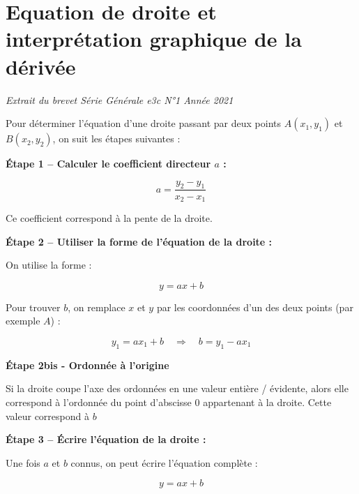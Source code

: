 \documentclass[a4paper,12pt]{article}
\begin{document}
\section*{Equation de droite et interprétation graphique de la dérivée}

\textit{Extrait du brevet Série Générale e3c N°1 Année 2021}

\vspace{1em}

\begin{tcolorbox}[colback=blue!5!white, colframe=blue!75!black, title=Méthode – Trouver l'équation d'une droite à partir de deux points, breakable]
  Pour déterminer l'équation d'une droite passant par deux points $A(x_1, y_1)$ et $B(x_2, y_2)$, on suit les étapes suivantes :
  
  \vspace{1em}
  
  \begin{compactitem}
      \item \textbf{Étape 1 – Calculer le coefficient directeur $a$ :}
  
      $$a = \frac{y_2 - y_1}{x_2 - x_1}$$
  
      Ce coefficient correspond à la pente de la droite.
  
      \item \textbf{Étape 2 – Utiliser la forme de l’équation de la droite :}
  
      On utilise la forme :
  
      $$y = ax + b$$
  
      Pour trouver $b$, on remplace $x$ et $y$ par les coordonnées d’un des deux points (par exemple $A$) :
  
      $$y_1 = a x_1 + b \quad \Rightarrow \quad b = y_1 - a x_1$$

      \item \textbf{Étape 2bis - Ordonnée à l'origine}
      
      Si la droite coupe l'axe des ordonnées en une valeur entière / évidente, alors elle correspond à l'ordonnée du point d'abscisse 0 appartenant à la droite. 
      Cette valeur correspond à $b$
  
      \item \textbf{Étape 3 – Écrire l’équation de la droite :}
  
      Une fois $a$ et $b$ connus, on peut écrire l’équation complète :
  
      $$y = ax + b$$
  \end{compactitem}
  
  \end{tcolorbox}
\end{document}
